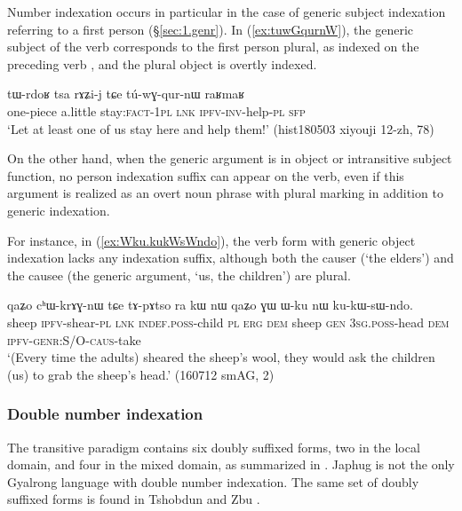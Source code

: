 Number indexation occurs in particular in the case of generic subject indexation referring to a first person (§\ref{sec:1.genr}). In (\ref{ex:tuwGqurnW}), the generic subject of the verb  corresponds to the first person plural, as indexed on the preceding verb , and the plural object is overtly indexed.

\begin{exe}
\ex \label{ex:tuwGqurnW}
\gll tɯ-rdoʁ tsa rɤʑi-j tɕe tú-wɣ-qur-nɯ raʁmaʁ \\
one-piece a.little stay:\textsc{fact}-\textsc{1pl} \textsc{lnk} \textsc{ipfv}-\textsc{inv}-help-\textsc{pl} \textsc{sfp} \\
\glt `Let at least one of us stay here and help them!' (hist180503 xiyouji 12-zh, 78)
\end{exe}

On the other hand, when the generic argument is in object or intransitive subject function, no person indexation suffix can appear on the verb, even if this argument is realized as an overt noun phrase with plural marking in addition to generic indexation.

For instance, in (\ref{ex:Wku.kukWsWndo}), the verb form with generic object indexation  lacks any indexation suffix, although both the causer (`the elders') and the causee (the generic argument,  `us, the children') are plural.

\begin{exe}
\ex \label{ex:Wku.kukWsWndo}
\gll qaʑo cʰɯ-krɤɣ-nɯ tɕe tɤ-pɤtso ra kɯ nɯ qaʑo ɣɯ ɯ-ku nɯ ku-kɯ-sɯ-ndo. \\
sheep \textsc{ipfv}-shear-\textsc{pl} \textsc{lnk} \textsc{indef}.\textsc{poss}-child \textsc{pl} \textsc{erg} \textsc{dem} sheep \textsc{gen} \textsc{3sg}.\textsc{poss}-head \textsc{dem} \textsc{ipfv}-\textsc{genr}:S/O-\textsc{caus}-take \\
\glt `(Every time the adults) sheared the sheep's wool, they would ask the children (us) to grab the sheep's head.' (160712 smAG, 2)
\end{exe}

\subsubsection{Double number indexation}  \label{sec:double.number.indexation}
The transitive paradigm contains six doubly suffixed forms, two in the local domain, and four in the mixed domain, as summarized in . Japhug is not the only Gyalrong language with double number indexation. The same set of doubly suffixed forms is found in Tshobdun \citep{jackson02rentongdengdi} and Zbu \citep{gongxun14agreement}.

